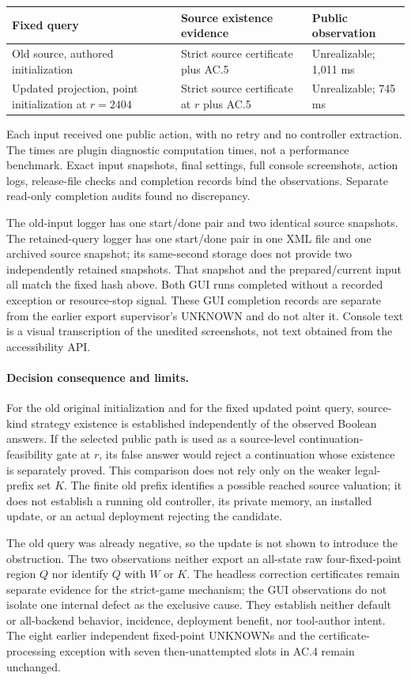 \begin{center}\small
\begin{tabular}{@{}L{57mm}L{37mm}L{49mm}@{}}\toprule
Fixed query & Source existence evidence & Public observation\\\midrule
Old source, authored initialization &
Strict source certificate plus AC.5 &
Unrealizable; 1,011 ms\\[3pt]
Updated projection, point initialization at $r=2404$ &
Strict source certificate at $r$ plus AC.5 &
Unrealizable; 745 ms\\\bottomrule
\end{tabular}
\end{center}
Each input received one public action, with no retry and no controller
extraction. The times are plugin diagnostic computation times, not a
performance benchmark. Exact input snapshots, final settings, full
console screenshots, action logs, release-file checks and completion
records bind the observations. Separate read-only completion audits
found no discrepancy.

The old-input logger has one start/done pair and two identical source
snapshots. The retained-query logger has one start/done pair in one XML
file and one archived source snapshot; its same-second storage does not
provide two independently retained snapshots. That snapshot and the
prepared/current input all match the fixed hash above. Both GUI runs
completed without a recorded exception or resource-stop signal. These
GUI completion records are separate from the earlier export supervisor's
UNKNOWN and do not alter it. Console text is a visual transcription of
the unedited screenshots, not text obtained from the accessibility API.

\paragraph{Decision consequence and limits.}
For the old original initialization and for the fixed updated point
query, source-kind strategy existence is established independently of
the observed Boolean answers. If the selected public path is used as a
source-level continuation-feasibility gate at $r$, its false answer
would reject a continuation whose existence is separately proved.
This comparison does not rely only on the weaker legal-prefix set $K$.
The finite old prefix identifies a possible reached source valuation;
it does not establish a running old controller, its private memory,
an installed update, or an actual deployment rejecting the candidate.

The old query was already negative, so the update is not shown to
introduce the obstruction. The two observations neither export an
all-state raw four-fixed-point region $Q$ nor identify $Q$ with $W$ or
$K$. The headless correction certificates remain separate evidence for
the strict-game mechanism; the GUI observations do not isolate one
internal defect as the exclusive cause. They establish neither default
or all-backend behavior, incidence, deployment benefit, nor tool-author
intent. The eight earlier independent fixed-point UNKNOWNs and the
certificate-processing exception with seven then-unattempted slots in
AC.4 remain unchanged.
